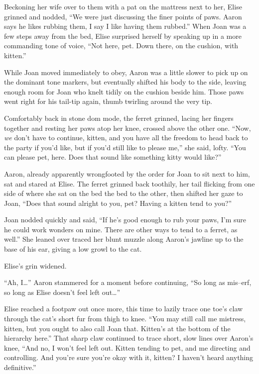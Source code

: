 \documentclass[12pt,letterpaper,oneside]{memoir}
\begin{document}
  Beckoning her wife over to them with a pat on the mattress next to her, Elise grinned and nodded, ``We were just discussing the finer points of paws. Aaron says he likes rubbing them, I say I like having them rubbed.'' When Joan was a few steps away from the bed, Elise surprised herself by speaking up in a more commanding tone of voice, ``Not here, pet. Down there, on the cushion, with kitten.''

  While Joan moved immediately to obey, Aaron was a little slower to pick up on the dominant tone markers, but eventually shifted his body to the side, leaving enough room for Joan who knelt tidily on the cushion beside him. Those paws went right for his tail-tip again, thumb twirling around the very tip.

  Comfortably back in stone dom mode, the ferret grinned, lacing her fingers together and resting her paws atop her knee, crossed above the other one. ``Now, \textit{we} don't have to continue, kitten, and you have all the freedom to head back to the party if you'd like, but if you'd still like to please me,'' she said, lofty. ``You can please pet, here. Does that sound like something kitty would like?''

  Aaron, already apparently wrongfooted by the order for Joan to sit next to him, sat and stared at Elise. The ferret grinned back toothily, her tail flicking from one side of where she sat on the bed the bed to the other, then shifted her gaze to Joan, ``Does that sound alright to you, pet? Having a kitten tend to you?''

  Joan nodded quickly and said, ``If he's good enough to rub your paws, I'm sure he could work wonders on mine. There are other ways to tend to a ferret, as well.'' She leaned over traced her blunt muzzle along Aaron's jawline up to the base of his ear, giving a low growl to the cat.

  Elise's grin widened.

  ``Ah, I\ldots{}'' Aaron stammered for a moment before continuing, ``So long as mis--erf, so long as Elise doesn't feel left out\ldots{}''

  Elise reached a footpaw out once more, this time to lazily trace one toe's claw through the cat's short fur from thigh to knee. ``You may still call me mistress, kitten, but you ought to also call Joan that. Kitten's at the bottom of the hierarchy here.'' That sharp claw continued to trace short, slow lines over Aaron's knee, ``And no, I won't feel left out. Kitten tending to pet, and me directing and controlling. And you're sure you're okay with it, kitten? I haven't heard anything definitive.''
\end{document}
